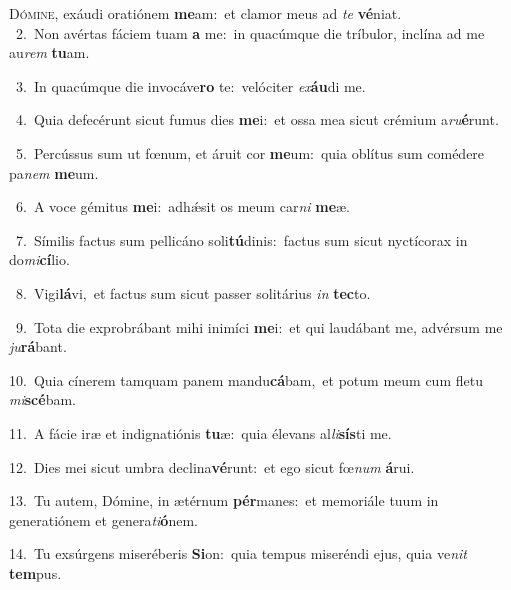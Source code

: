 \lettrine{\initial\textcolor{\initialcolor}{D}}{ómine,} exáudi oratiónem \textbf{me}\-am:~\star et clamor meus ad \textit{te} \textbf{vé}\-niat.\\
{\numbfont\textcolor{\numbcolor}{~2.}}~Non avértas fáciem tuam \textbf{a} me:~\star in quacúmque die tríbulor, inclína ad me au\textit{rem} \textbf{tu}\-am.\par
{\numbfont\textcolor{\numbcolor}{~3.}}~In quacúmque die invocáve\textbf{ro} te:~\star velóciter \textit{ex}\-\textbf{áu}di me.\par
{\numbfont\textcolor{\numbcolor}{~4.}}~Quia defecérunt sicut fumus dies \textbf{me}\-i:~\star et ossa mea sicut crémium a\-\textit{ru}\-\textbf{é}runt.\par
{\numbfont\textcolor{\numbcolor}{~5.}}~Percússus sum ut fœnum, et áruit cor \textbf{me}\-um:~\star quia oblítus sum comédere pa\textit{nem} \textbf{me}\-um.\par
{\numbfont\textcolor{\numbcolor}{~6.}}~A voce gémitus \textbf{me}\-i:~\star adhǽsit os meum car\textit{ni} \textbf{me}\-æ.\par
{\numbfont\textcolor{\numbcolor}{~7.}}~Símilis factus sum pellicáno soli\-\textbf{tú}\-dinis:~\star factus sum sicut nyctícorax in do\-\textit{mi}\-\textbf{cí}lio.\par
{\numbfont\textcolor{\numbcolor}{~8.}}~Vigi\-\textbf{lá}\-vi,~\star et factus sum sicut passer solitárius \textit{in} \textbf{tec}\-to.\par
{\numbfont\textcolor{\numbcolor}{~9.}}~Tota die exprobrábant mihi inimíci \textbf{me}\-i:~\star et qui laudábant me, advérsum me \textit{ju}\-\textbf{rá}bant.\par
{\numbfont\textcolor{\numbcolor}{10.}}~Quia cínerem tamquam panem mandu\-\textbf{cá}\-bam,~\star et potum meum cum fletu \textit{mi}\-\textbf{scé}bam.\par
{\numbfont\textcolor{\numbcolor}{11.}}~A fácie iræ et indignatiónis \textbf{tu}\-æ:~\star quia élevans al\-\textit{li}\-\textbf{sís}ti me.\par
{\numbfont\textcolor{\numbcolor}{12.}}~Dies mei sicut umbra declina\-\textbf{vé}\-runt:~\star et ego sicut fœ\textit{num} \textbf{á}\-rui.\par
{\numbfont\textcolor{\numbcolor}{13.}}~Tu autem, Dómine, in ætérnum \textbf{pér}\-manes:~\star et memoriále tuum in generatiónem et genera\-\textit{ti}\-\textbf{ó}nem.\par
{\numbfont\textcolor{\numbcolor}{14.}}~Tu exsúrgens miseréberis \textbf{Si}\-on:~\star quia tempus miseréndi ejus, quia ve\textit{nit} \textbf{tem}\-pus.\par
